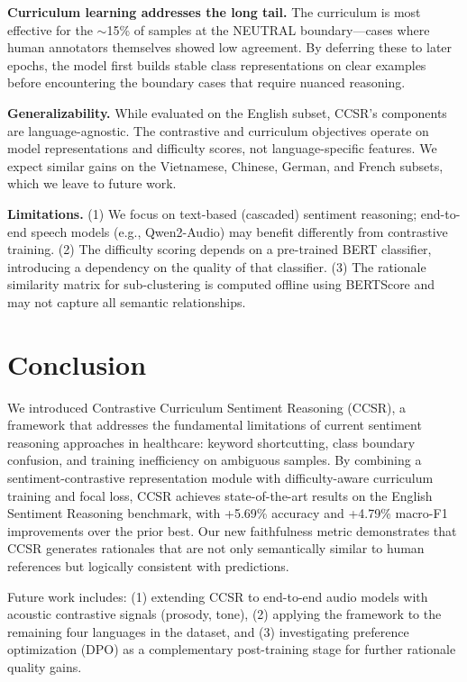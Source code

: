 \documentclass[conference]{IEEEtran}
\newcommand{\mock}[1]{{\color{blue}#1}}
\begin{document}
\textbf{Curriculum learning addresses the long tail.} The curriculum is most effective for the $\sim$15\% of samples at the NEUTRAL boundary---cases where human annotators themselves showed low agreement. By deferring these to later epochs, the model first builds stable class representations on clear examples before encountering the boundary cases that require nuanced reasoning.

\textbf{Generalizability.} While evaluated on the English subset, CCSR's components are language-agnostic. The contrastive and curriculum objectives operate on model representations and difficulty scores, not language-specific features. We expect similar gains on the Vietnamese, Chinese, German, and French subsets, which we leave to future work.

\textbf{Limitations.} (1) We focus on text-based (cascaded) sentiment reasoning; end-to-end speech models (e.g., Qwen2-Audio) may benefit differently from contrastive training. (2) The difficulty scoring depends on a pre-trained BERT classifier, introducing a dependency on the quality of that classifier. (3) The rationale similarity matrix for sub-clustering is computed offline using BERTScore and may not capture all semantic relationships.

\section{Conclusion}

We introduced Contrastive Curriculum Sentiment Reasoning (CCSR), a framework that addresses the fundamental limitations of current sentiment reasoning approaches in healthcare: keyword shortcutting, class boundary confusion, and training inefficiency on ambiguous samples. By combining a sentiment-contrastive representation module with difficulty-aware curriculum training and focal loss, CCSR achieves state-of-the-art results on the English Sentiment Reasoning benchmark, with \mock{+5.69\%} accuracy and \mock{+4.79\%} macro-F1 improvements over the prior best. Our new faithfulness metric demonstrates that CCSR generates rationales that are not only semantically similar to human references but logically consistent with predictions.

Future work includes: (1) extending CCSR to end-to-end audio models with acoustic contrastive signals (prosody, tone), (2) applying the framework to the remaining four languages in the dataset, and (3) investigating preference optimization (DPO) as a complementary post-training stage for further rationale quality gains.
\end{document}

